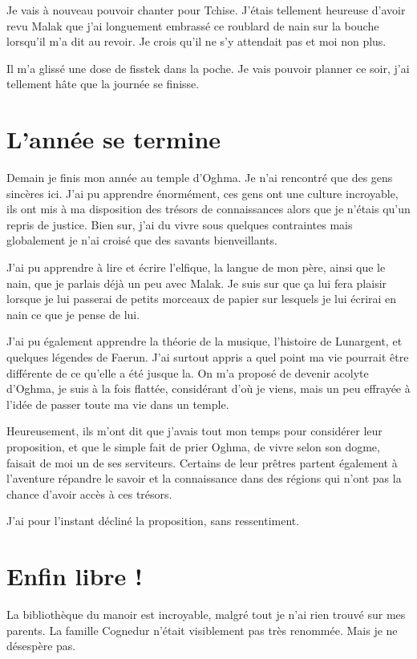 \documentclass[10pt,a4paper,twoside,twocolumn,openany]{book}
\begin{document}
Je vais à nouveau pouvoir chanter pour Tchise. J'étais tellement heureuse d'avoir revu
Malak que j'ai longuement embrassé ce roublard de nain sur la bouche lorsqu'il m'a dit au revoir. Je crois qu'il ne s'y 
attendait pas et moi non plus.

Il m'a glissé une dose de fisstek dans la poche. Je vais pouvoir planner ce soir, j'ai tellement hâte que la journée 
se finisse.

\section{L'année se termine}
Demain je finis mon année au temple d'Oghma. Je n'ai rencontré que des gens sincères ici.
J'ai pu apprendre énormément, ces gens ont une culture incroyable, ils ont mis à ma 
disposition des trésors de connaissances alors que je n'étais qu'un repris de justice.
Bien sur, j'ai du vivre sous quelques contraintes mais globalement je n'ai croisé
que des savants bienveillants.

J'ai pu apprendre à lire et écrire l'elfique, la langue de mon père, ainsi que le nain, que je parlais
déjà un peu avec Malak. Je suis sur que ça lui fera plaisir lorsque je lui passerai de petits morceaux
de papier sur lesquels je lui écrirai en nain ce que je pense de lui.

J'ai pu également apprendre la théorie de la musique, l'histoire de Lunargent, et quelques légendes
de Faerun.
J'ai surtout appris a quel point ma vie pourrait être différente de ce qu'elle a été
jusque la. On m'a proposé de devenir acolyte d'Oghma, je suis à la fois flattée, considérant
d'où je viens, mais un peu effrayée à l'idée de passer toute ma vie dans un temple.

Heureusement, ils m'ont dit que j'avais tout mon temps pour considérer leur proposition, et que le
simple fait de prier Oghma, de vivre selon son dogme, faisait de moi un de ses serviteurs.
Certains de leur prêtres partent également à l'aventure répandre le savoir et la connaissance
dans des régions qui n'ont pas la chance d'avoir accès à ces trésors.

J'ai pour l'instant décliné la proposition, sans ressentiment.

\section{Enfin libre !}

La bibliothèque du manoir est incroyable, malgré tout je n'ai rien trouvé sur mes parents. 
La famille Cognedur n'était visiblement pas très renommée. Mais je ne désespère pas.
\end{document}
